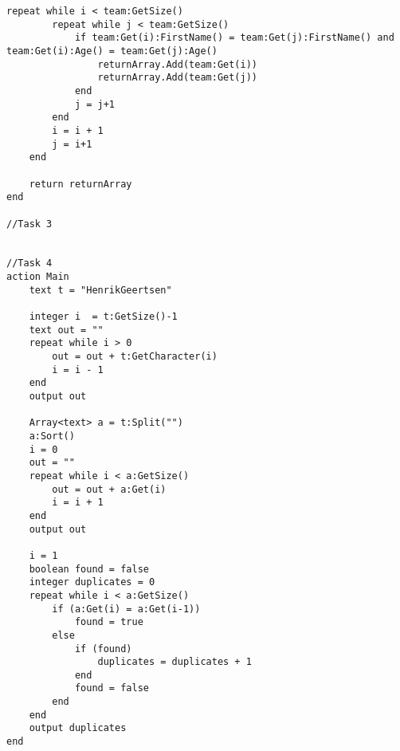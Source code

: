 \begin{lstlisting}[language=Quorum,tabsize=2]
	repeat while i < team:GetSize()
		repeat while j < team:GetSize()
			if team:Get(i):FirstName() = team:Get(j):FirstName() and team:Get(i):Age() = team:Get(j):Age()
				returnArray.Add(team:Get(i))
				returnArray.Add(team:Get(j))
			end
			j = j+1
		end
		i = i + 1
		j = i+1
	end
	
	return returnArray
end

//Task 3


//Task 4
action Main
	text t = "HenrikGeertsen"
	
	integer i  = t:GetSize()-1
	text out = ""
	repeat while i > 0
		out = out + t:GetCharacter(i)
		i = i - 1
	end
	output out
	
	Array<text> a = t:Split("")
	a:Sort()
	i = 0
	out = ""
	repeat while i < a:GetSize()
		out = out + a:Get(i)
		i = i + 1
	end
	output out
	
	i = 1
	boolean found = false
	integer duplicates = 0
	repeat while i < a:GetSize()
		if (a:Get(i) = a:Get(i-1))
			found = true
		else
			if (found)
				duplicates = duplicates + 1
			end
			found = false
		end	
	end
	output duplicates
end
\end{lstlisting}

